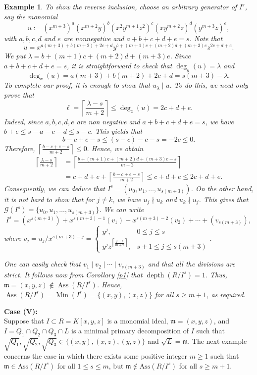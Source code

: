 \documentclass[11pt]{amsart}
\newtheorem{example}[theorem]{Example}
\def\Ass{\operatorname{Ass}}
\def\Min{\operatorname{Min}}
\def\depth{\operatorname{depth}}
\begin{document}
\begin{example}
{To show the reverse inclusion, choose an arbitrary generator of $I^{s}$, say the monomial
 $$u:=(x^{m+3})^a (x^{m+2}y)^b (x^2y^{m+1}z^2)^c (xy^{m+2}z)^d (y^{m+3}z)^e,$$ with
$a,b,c,d$ and $e$ are nonnegative and $a+b+c+d+e=s$.
Note that $$u=x^{a(m+3)+b(m+2)+2c+d}y^{b+(m+1)c+(m+2)d+(m+3)e}z^{2c+d+e}.$$
We put  $\lambda=b+(m+1)c+(m+2)d+(m+3)e$. Since $a+b+c+d+e=s$, it  is straightforward to check that 
$\deg_y(u) =\lambda$ and 
$$\deg_x(u) = a(m+3)+b(m+2)+2c+d = s(m+3)-\lambda.$$
To complete our proof,  it is enough to show that $u_\lambda\mid u$. To do this, we need only prove that 
$$\ell = \left\lceil \frac{\lambda-s}{m+2} \right\rceil \leq \deg_z(u)=2c+d+e.$$
Indeed, since $a,b,c,d,e$ are non negative and $a+b+c+d+e=s$, we have 
 $b+e\leq s-a-c-d\leq s-c.$ This yields that 
\[
b-c+e-s\leq (s-c)-c-s=-2c\leq 0.
\]
Therefore, $\left\lceil \frac{b-c+e-s}{m+2} \right\rceil\leq 0.$ Hence, we obtain 
\begin{align*}
\left\lceil \frac{\lambda-s}{m+2} \right\rceil &= \left\lceil \frac{b + (m+1)c + (m+2)d + (m+3)e - s}{m+2} \right\rceil  \\
&= c+d+e + \left\lceil \frac{b - c + e -s}{m+2} \right\rceil \leq c+d+e \leq 2c+d+e. 
\end{align*}
 Consequently, we can deduce that  $I^s=(u_0,u_1,\ldots,u_{s(m+3)})$.  On the other hand, it is not hard to show that 
 for $j\neq k$, we have $u_j\nmid u_k$ and $u_k\nmid u_j$. This gives that  $\mathcal{G}(I^{s})=\{u_0,u_1,\ldots,u_{s(m+3)}\}$. 
 We can write 
$$
I^{s}
= (x^{s(m+3)}) 
+ x^{s(m+3)-1}(v_1)
+ x^{s(m+3)-2}(v_2) + \cdots + (v_{s(m+3)}),$$
where $v_j=u_j / x^{s(m+3)-j} = \begin{cases} y^j, & 0\leq j\leq s  \\ y^jz^{\left\lceil \frac{j-s}{m+2} \right\rceil}, & s+1
\leq j\leq s(m+3)
\end{cases}$. 

One can easily check that  $v_1\mid v_2\mid \cdots \mid v_{s(m+3)}$   and that all the divisions are strict.
It follows now from  Corollary \ref{p1}  that $\depth(R/I^{s})=1$. Thus, $\mathfrak m=(x,y,z)\notin \Ass(R/I^{s})$. 
Hence, $\Ass(R/I^s)=\Min(I^s)=\{(x,y),(x,z)\}$ for all $s\geq m+1$, as required.
}
\end{example}


 
 \medskip
\noindent\textbf{Case (V):} \\
Suppose that  $I\subset R=K[x,y,z]$ is a monomial ideal, $\mathfrak{m}=(x,y,z)$, and $I=Q_1 \cap Q_2 \cap Q_3 \cap L$ is  a minimal
 primary decomposition of $I$ such that $\sqrt{Q_1} , \sqrt{Q_2}, \sqrt{Q_3}\in \{(x,y), (x,z), (y,z)\}$ and $\sqrt{L}=\mathfrak{m}$. 
 The next example concerns the case  in which there exists some positive integer $m\geq 1$ such that 
  $\mathfrak{m}\in \mathrm{Ass}(R/I^s)$ for all $1\leq s \leq m$,   but  
 $\mathfrak{m}\notin \mathrm{Ass}(R/I^s)$ for all $s \geq m+1$. 
\end{document}
